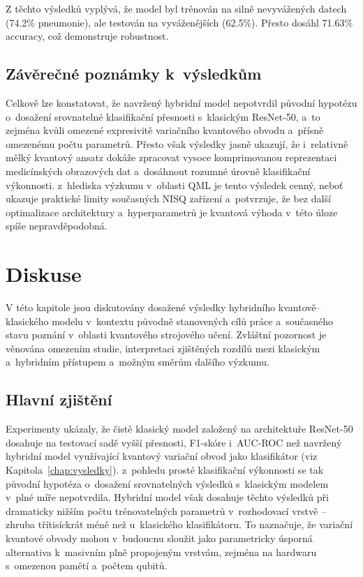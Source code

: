 \documentclass[12pt, a4paper]{report}
\begin{document}
Z těchto výsledků vyplývá, že model byl trénován na silně nevyvážených datech (74.2\% pneumonie), ale testován na vyváženějších (62.5\%). Přesto dosáhl 71.63\% accuracy, což demonstruje robustnost.

\section{Závěrečné poznámky k~výsledkům}
Celkově lze konstatovat, že navržený hybridní model nepotvrdil původní hypotézu o~dosažení srovnatelné klasifikační přesnosti s~klasickým ResNet-50, a~to zejména kvůli omezené expresivitě variačního kvantového obvodu a~přísně omezenému počtu parametrů.\cite{barren_plateaus} Přesto však výsledky jasně ukazují, že i~relativně mělký kvantový ansatz dokáže zpracovat vysoce komprimovanou reprezentaci medicínských obrazových dat a~dosáhnout rozumné úrovně klasifikační výkonnosti. z~hlediska výzkumu v~oblasti QML je tento výsledek cenný, neboť ukazuje praktické limity současných NISQ zařízení a~potvrzuje, že bez další optimalizace architektury a~hyperparametrů je kvantová výhoda v~této úloze spíše nepravděpodobná. 

\chapter{Diskuse} \label{chap:diskuse}

V této kapitole jsou diskutovány dosažené výsledky hybridního kvantově–klasického modelu v~kontextu původně stanovených cílů práce a~současného stavu poznání v~oblasti kvantového strojového učení. Zvláštní pozornost je věnována omezením studie, interpretaci zjištěných rozdílů mezi klasickým a~hybridním přístupem a~možným směrům dalšího výzkumu.

\section{Hlavní zjištění}

Experimenty ukázaly, že čistě klasický model založený na architektuře ResNet-50 dosahuje na testovací sadě vyšší přesnosti, F1-skóre i~AUC-ROC než navržený hybridní model využívající kvantový variační obvod jako klasifikátor (viz Kapitola~\ref{chap:vysledky}). z~pohledu prosté klasifikační výkonnosti se tak původní hypotéza o~dosažení srovnatelných výsledků s~klasickým modelem v~plné míře nepotvrdila. Hybridní model však dosahuje těchto výsledků při dramaticky nižším počtu trénovatelných parametrů v~rozhodovací vrstvě – zhruba třítisíckrát méně než u~klasického klasifikátoru. To naznačuje, že variační kvantové obvody mohou v~budoucnu sloužit jako parametricky úsporná alternativa k~masivním plně propojeným vrstvám, zejména na hardwaru s~omezenou pamětí a~počtem qubitů.
\end{document}
